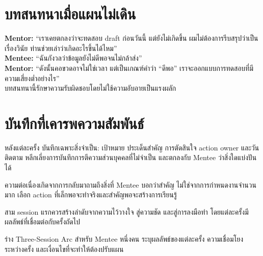 \section{บทสนทนาเมื่อแผนไม่เดิน}
\begin{examplebox}
\textbf{Mentor:} \enquote{เราเคยตกลงว่าจะทดสอบ draft ก่อนวันนี้ แต่ยังไม่เกิดขึ้น ผมไม่ต้องการรีบสรุปว่าเป็นเรื่องวินัย ท่านช่วยเล่าว่าเกิดอะไรขึ้นได้ไหม}\\
\textbf{Mentee:} \enquote{ฉันกังวลว่าข้อมูลยังไม่ดีพอจนไม่กล้าส่ง}\\
\textbf{Mentor:} \enquote{ดังนั้นคอขวดอาจไม่ใช่เวลา แต่เป็นเกณฑ์คำว่า ``ดีพอ'' เราจะออกแบบการทดสอบที่มีความเสี่ยงต่ำอย่างไร}\\
บทสนทนานี้รักษาความรับผิดชอบโดยไม่ใช้ความอับอายเป็นแรงผลัก
\end{examplebox}

\section{บันทึกที่เคารพความสัมพันธ์}
หลังแต่ละครั้ง บันทึกเฉพาะสิ่งจำเป็น: เป้าหมาย ประเด็นสำคัญ การตัดสินใจ action owner และวันติดตาม หลีกเลี่ยงการบันทึกการตีความส่วนบุคคลที่ไม่จำเป็น และตกลงกับ Mentee ว่าสิ่งใดแบ่งปันได้

\begin{mentornote}
ความต่อเนื่องเกิดจากการกลับมาถามถึงสิ่งที่ Mentee บอกว่าสำคัญ ไม่ใช่จากการกำหนดงานจำนวนมาก เลือก action ที่เล็กพอจะทำจริงและสำคัญพอจะสร้างการเรียนรู้
\end{mentornote}

\begin{keytakeaway}
สาม session แรกควรสร้างลำดับจากความไว้วางใจ สู่ความชัด และสู่การลงมือทำ โดยแต่ละครั้งมีผลลัพธ์ที่เชื่อมต่อกับครั้งถัดไป
\end{keytakeaway}

\begin{reflection}
ร่าง Three-Session Arc สำหรับ Mentee หนึ่งคน ระบุผลลัพธ์ของแต่ละครั้ง ความเชื่อมโยงระหว่างครั้ง และเงื่อนไขที่จะทำให้ต้องปรับแผน
\blankline\blankline
\end{reflection}


